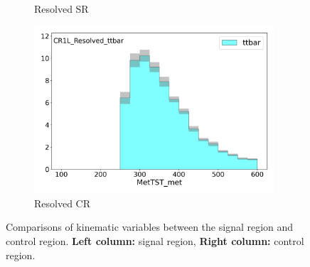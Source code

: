 \begin{figure}[htbp]
\begin{subfigure}{0.49\textwidth}
      \caption{Resolved SR \met}
      \end{subfigure}
      \begin{subfigure}{0.49\textwidth}
      \includegraphics[width = 0.98\textwidth]{Figures/4/CRSR/CR1L_Resolved_ttbar/MetTST_met.png}
      \caption{Resolved CR \met}
      \end{subfigure}


       \caption{Comparisons of kinematic variables between the \resolved signal region and \ttbar control region. \textbf{Left column:} signal region, \textbf{Right column:} control region.}
       \label{fig:CRSR_resolved}
    \end{figure}

